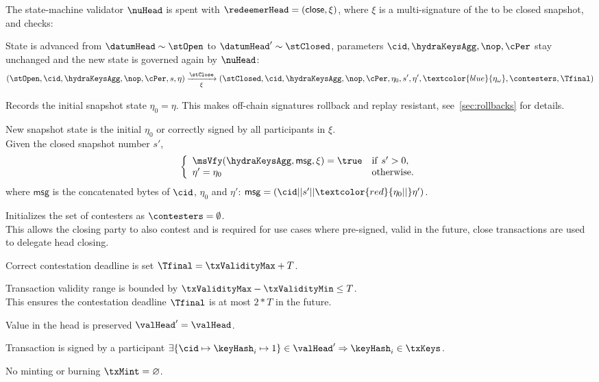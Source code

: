 \begin{samepage}
	\noindent The state-machine validator $\nuHead$ is spent with
	$\redeemerHead = (\mathsf{close}, \xi)$, where $\xi$ is a multi-signature of
	the to be closed snapshot, and checks:
	\begin{menumerate}
		\item State is advanced from $\datumHead \sim \stOpen$ to
		$\datumHead' \sim \stClosed$, parameters $\cid,\hydraKeysAgg,\nop,\cPer$
		stay unchanged and the new state is governed again by $\nuHead$:
		\[
			(\stOpen,\cid,\hydraKeysAgg,\nop,\cPer,s,\eta) \xrightarrow[\xi]{\stClose} (\stClosed,\cid,\hydraKeysAgg,\nop,\cPer,\eta_0,s',\eta',\textcolor{blue}{\eta_{\omega}},\contesters,\Tfinal)
		\]
		\item Records the initial snapshot state $\eta_0 = \eta$. 
		This makes off-chain signatures rollback and replay resistant,
		see~\ref{sec:rollbacks} for details.
		\item New snapshot state is the initial $\eta_{0}$
		or correctly signed by all participants in $\xi$. \\
		Given the closed snapshot number $s'$,
		\[
			\left\{\begin{array}{ll}
				\msVfy(\hydraKeysAgg,\mathsf{msg},\xi) = \true & \mathrm{if} ~ s' > 0, \\
				\eta' = \eta_{0}                               & \mathrm{otherwise.}
			\end{array}\right.
		\]
		where $\mathsf{msg}$ is the concatenated bytes of $\cid$, $\eta_{0}$
		and $\eta'$: $\mathsf{msg} = (\cid || s' || \textcolor{red}{\eta_{0} ||} \eta')$.
		\item Initializes the set of contesters as $\contesters = \emptyset$. \\
		This allows the closing party to also contest and is required for use
		cases where pre-signed, valid in the future, close transactions are
		used to delegate head closing.

		\item Correct contestation deadline is set $\Tfinal = \txValidityMax + T$.
		\item Transaction validity range is bounded by
		$\txValidityMax - \txValidityMin \leq T$. \\
		This ensures the contestation deadline $\Tfinal$ is at most $2*T$ in the future.
		\item Value in the head is preserved $\valHead' = \valHead$.
		\item Transaction is signed by a participant $\exists \{\cid \mapsto \keyHash_{i} \mapsto 1\} \in \valHead' \Rightarrow \keyHash_{i} \in \txKeys$.
		\item No minting or burning $\txMint = \varnothing$.
	\end{menumerate}
\end{samepage}

